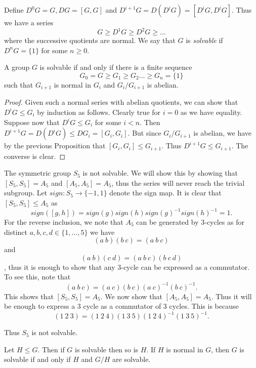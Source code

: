 \documentclass[twoside, a4paper, 10pt]{amsart}
\begin{document}
\begin{mydef} Define $D^{0}G =G, DG = [G,G]$ and $D^{i+1}G = D (D^{i}G) = [D^iG, D^iG]$. Thus we have a series $$G \geq D^1 G \geq D^2 G \geq \ldots$$ where the successive quotients are normal. We say that $G$ is \textit{solvable} if $D^nG = \{1\}$ for some $n \geq 0$.

\end{mydef}

\begin{prop} A group $G$ is solvable if and only if there is a finite sequence $$G_0 = G \geq G_1 \geq G_2 \ldots \geq G_n = \{1\}$$ such that $G_{i+1}$ is normal in $G_i$ and $G_i/G_{i+1}$ is abelian.

\end{prop}

\begin{proof} Given such a normal series with abelian quotients, we can show that $D^i G \leq G_i$ by induction as follows. Clearly true for $i=0$ as we have equality. Suppose now that $D^i G \leq G_i$ for some $i < n$. Then $D^{i+1}G = D(D^iG) \leq DG_{i} = [G_{i}, G_{i}]$. But since $G_i /G_{i+1}$ is abelian, we have by the previous Proposition that $[G_{i}, G_{i}] \leq G_{i+1}$. Thus $D^{i+1}G \leq G_{i+1}$. The converse is clear.\end{proof}

\begin{eg} The symmetric group $S_5$ is not solvable. We will show this by showing that $[S_5, S_5] = A_5$ and $[A_5, A_5] = A_5$, thus the series will never reach the trivial subgroup. Let $sign:S_5 \to \{-1,1\}$ denote the sign map. It is clear that $[S_5, S_5] \leq A_5$ as $$sign([g,h]) = sign(g)sign(h)sign(g)^{-1}sign(h)^{-1} = 1.$$ For the reverse inclusion, we note that $A_5$ can be generated by $3$-cycles as for distinct $a,b,c,d \in \{1, \ldots, 5\}$ we have $$(a~b)(b~c) = (a~b~c)$$ and $$(a~b)(c~d) = (a~b~c)(b~c~d)$$, thus it is enough to show that any $3$-cycle can be expressed as a commutator. To see this, note that $$(a~b~c) = (a~c)(b~c)(a~c)^{-1}(b~c)^{-1}.$$ This shows that $[S_5,S_5] = A_5$. We now show that $[A_5, A_5] = A_5$. Thus it will be enough to express a $3$ cycle as a commutator of $3$ cycles. This is because $$(1~2~3) = (1~2~4)(1~3~5)(1~2~4)^{-1}(1~3~5)^{-1}.$$

Thus $S_5$ is not solvable.
\end{eg}

\begin{prop} Let $H \leq G$. Then if $G$ is solvable then so is $H$. If $H$ is normal in $G$, then $G$ is solvable if and only if $H$ and $G/H$ are solvable.

\end{prop}
\end{document}
